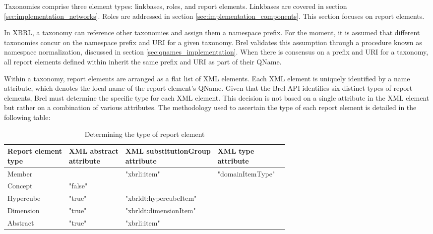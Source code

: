 Taxonomies comprise three element types: linkbases, roles, and report elements.
Linkbases are covered in section \ref{sec:implementation_networks}.
Roles are addressed in section \ref{sec:implementation_components}.
This section focuses on report elements.

In XBRL, a taxonomy can reference other taxonomies and assign them a namespace prefix.
For the moment, it is assumed that different taxonomies concur on the namespace prefix and URI for a given taxonomy.
Brel validates this assumption through a procedure known as namespace normalization, discussed in section \ref{sec:qnames_implementation}.
When there is consensus on a prefix and URI for a taxonomy, all report elements defined within inherit the same prefix and URI as part of their QName.

Within a taxonomy, report elements are arranged as a flat list of XML elements.
Each XML element is uniquely identified by a name attribute, which denotes the local name of the report element's QName.
Given that the Brel API identifies six distinct types of report elements, Brel must determine the specific type for each XML element.
This decision is not based on a single attribute in the XML element but rather on a combination of various attributes.
The methodology used to ascertain the type of each report element is detailed in the following table:

\begin{table}[H]
    \centering
    \begin{tabular}{|l|l|l|l|l|}
        \hline
        \makecell[l]{\textbf{Report element} \\ \textbf{type}}  & 
        \makecell[l]{\textbf{XML abstract} \\ \textbf{attribute}} &
        \makecell[l]{\textbf{XML substitutionGroup} \\ \textbf{attribute}} & 
        \makecell[l]{\textbf{XML type} \\ \textbf{attribute}} \\ \hline
        Member      &           & "xbrli:item"                          & "domainItemType" \\ \hline
        Concept     & "false"   &                                       &                            \\ \hline
        Hypercube   & "true"    & "xbrldt:hypercubeItem"                &                            \\ \hline
        Dimension   & "true"    & "xbrldt:dimensionItem"                &                            \\ \hline
        Abstract    & "true"    & "xbrli:item"                          &                            \\ \hline
    \end{tabular}
    \caption{Determining the type of report element}
    \label{tab:determining_report_element_type}
\end{table}

